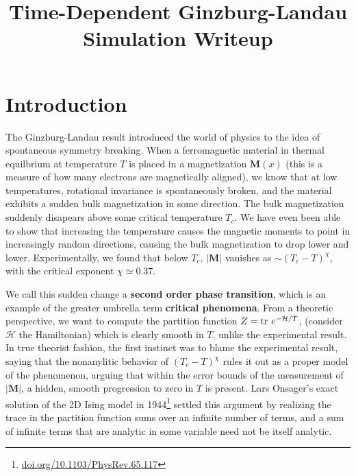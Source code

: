 \documentclass[10pt,twoside]{report}
\title{Time-Dependent Ginzburg-Landau Simulation Writeup}
\numberwithin{equation}{chapter}
\begin{document}
\maketitle
{}
\tableofcontents
\newpage
{}

\chapter{Introduction}

The Ginzburg-Landau result introduced the world of physics to the idea of spontaneous symmetry breaking.  When a ferromagnetic material in thermal equilbrium at temperature $T$ is placed in a magnetization $\bm{M}(x)$ (this is a measure of how many electrons are magnetically aligned), we know that at low temperatures, rotational invariance is spontaneously broken, and the material exhibits a sudden bulk magnetization in some direction.  The bulk magnetization suddenly disapears above some critical temperature $T_{c}$.  We have even been able to show that increasing the temperature causes the magnetic moments to point in increasingly random directions, causing the bulk magnetization to drop lower and lower.  Experimentally, we found that below $T_{c}$, $|\bm{M}|$ vanishes as $\sim (T_{c}-T)^{\chi}$, with the critical exponent $\chi\simeq 0.37$.

We call this sudden change a \textbf{second order phase transition}, which is an example of the greater umbrella term \textbf{critical phenomena}.  From a theoretic perspective, we want to compute the partition function $Z = \tr\, e^{-\mathcal{H}/T}$, (consider $\mathcal{H}$ the Hamiltonian) which is clearly smooth in $T$, unlike the experimental result.  In true theorist fashion, the first instinct was to blame the experimental result, saying that the nonanylitic behavior of $(T_{c}-T)^{\chi}$ rules it out as a proper model of the phenomenon, arguing that within the error bounds of the measurement of $|\bm{M}|$, a hidden, smooth progression to zero in $T$ is present. Lars Onsager's exact solution of the 2D Ising model in 1944\footnote{\href{https://doi.org/10.1103/PhysRev.65.117}{doi.org/10.1103/PhysRev.65.117}} settled this argument by realizing the trace in the partition function sums over an infinite number of terms, and a sum of infinite terms that are analytic in some variable need not be itself analytic.
\end{document}

